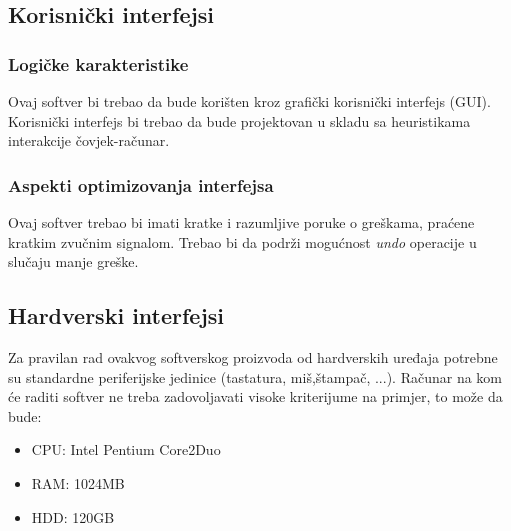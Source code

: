 \subsection{Korisnički interfejsi}
\subsubsection{Logičke karakteristike}
Ovaj softver bi trebao da bude korišten kroz grafički korisnički interfejs (GUI). Korisnički interfejs bi trebao da bude projektovan u skladu sa heuristikama interakcije čovjek-računar.

\subsubsection{Aspekti optimizovanja interfejsa}
Ovaj softver trebao bi imati kratke i razumljive poruke o greškama, praćene kratkim zvučnim signalom. Trebao bi da podrži mogućnost \textit{undo} operacije u slučaju manje greške.

\subsection{Hardverski interfejsi}
Za pravilan rad ovakvog softverskog proizvoda od hardverskih uređaja potrebne su standardne periferijske jedinice (tastatura, miš,štampač, ...). Računar na kom će raditi softver ne treba zadovoljavati visoke kriterijume na primjer, to može da bude:
\begin{itemize}
  \item CPU: Intel Pentium Core2Duo 
  \item RAM: 1024MB
  \item HDD: 120GB
\end{itemize}
